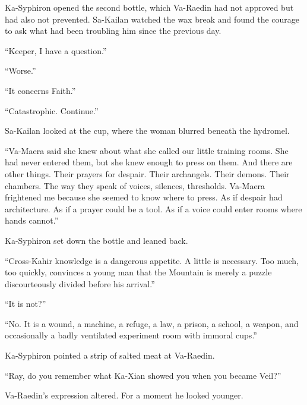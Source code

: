 

Ka-Syphiron opened the second bottle, which Va-Raedin had not approved but had also not prevented.
Sa-Kailan watched the wax break and found the courage to ask what had been troubling him since the previous day.\par

“Keeper, I have a question.”\par
“Worse.”\par
“It concerns Faith.”\par
“Catastrophic.
Continue.”\par

Sa-Kailan looked at the cup, where the woman blurred beneath the hydromel.\par

“Va-Maera said she knew about what she called our little training rooms.
She had never entered them, but she knew enough to press on them.
And there are other things.
Their prayers for despair.
Their archangels.
Their demons.
Their chambers.
The way they speak of voices, silences, thresholds.
Va-Maera frightened me because she seemed to know where to press.
As if despair had architecture.
As if a prayer could be a tool.
As if a voice could enter rooms where hands cannot.”\par

Ka-Syphiron set down the bottle and leaned back.\par

“Cross-Kahir knowledge is a dangerous appetite.
A little is necessary.
Too much, too quickly, convinces a young man that the Mountain is merely a puzzle discourteously divided before his arrival.”\par

“It is not?”\par
“No.
It is a wound, a machine, a refuge, a law, a prison, a school, a weapon, and occasionally a badly ventilated experiment room with immoral cups.”\par




Ka-Syphiron pointed a strip of salted meat at Va-Raedin.\par

“Ray, do you remember what Ka-Xian showed you when you became Veil?”\par

Va-Raedin’s expression altered.
For a moment he looked younger.\par

